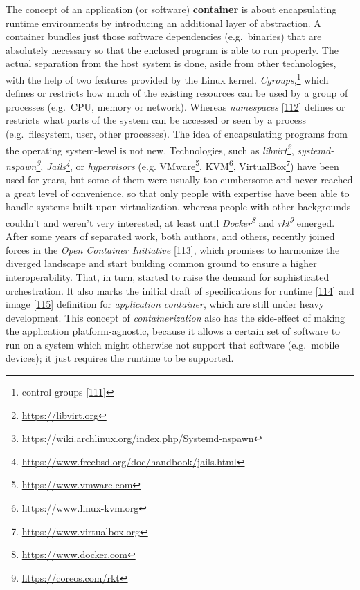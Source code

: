 \documentclass[12pt,english,a4paper,titlepage,cleardoublepage=empty,dottedtoc]{report}
\renewcommand{\href}[2]{#2\footnote{\url{#1}}}
\begin{document}
The concept of an application (or software)
\textbf{\protect\hypertarget{def--container}{}{container}} is about
encapsulating runtime environments by introducing an additional layer of
abstraction. A container bundles just those software dependencies
(e.g.~binaries) that are absolutely necessary so that the enclosed
program is able to run properly. The actual separation from the host
system is done, aside from other technologies, with the help of two
features provided by the Linux kernel. \emph{Cgroups},\footnote{control
  groups {[}\protect\hyperlink{ref-web_2015_cgroup-doc}{111}{]}} which
defines or restricts how much of the existing resources can be used by a
group of processes (e.g.~CPU, memory or network). Whereas
\emph{namespaces}
{[}\protect\hyperlink{ref-web_2016_kernel-namespace}{112}{]} defines or
restricts what parts of the system can be accessed or seen by a process
(e.g.~filesystem, user, other processes). The idea of encapsulating
programs from the operating system-level is not new. Technologies, such
as \emph{\href{https://libvirt.org}{libvirt}},
\emph{\href{https://wiki.archlinux.org/index.php/Systemd-nspawn}{systemd-nspawn}},
\emph{\href{https://www.freebsd.org/doc/handbook/jails.html}{Jails}}, or
\emph{hypervisors} (e.g. \href{https://www.vmware.com}{VMware},
\href{https://www.linux-kvm.org}{KVM},
\href{https://www.virtualbox.org}{VirtualBox}) have been used for years,
but some of them were usually too cumbersome and never reached a great
level of convenience, so that only people with expertise have been able
to handle systems built upon virtualization, whereas people with other
backgrounds couldn't and weren't very interested, at least until
\emph{\href{https://www.docker.com}{Docker}} and
\emph{\href{https://coreos.com/rkt}{rkt}} emerged. After some years of
separated work, both authors, and others, recently joined forces in the
\emph{Open Container Initiative}
{[}\protect\hyperlink{ref-web_2016_open-container-initiative}{113}{]},
which promises to harmonize the diverged landscape and start building
common ground to ensure a higher interoperability. That, in turn,
started to raise the demand for sophisticated orchestration. It also
marks the initial draft of specifications for runtime
{[}\protect\hyperlink{ref-web_oci-spec_runtime}{114}{]} and image
{[}\protect\hyperlink{ref-web_oci-spec_image}{115}{]} definition for
\emph{application container}, which are still under heavy development.
This concept of \emph{containerization} also has the side-effect of
making the application platform-agnostic, because it allows a certain
set of software to run on a system which might otherwise not support
that software (e.g.~mobile devices); it just requires the runtime to be
supported.
\end{document}
